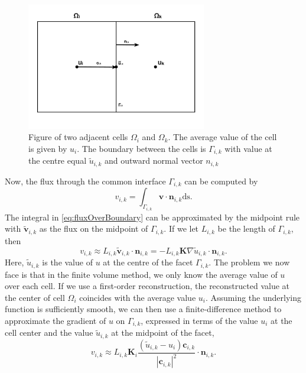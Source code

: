 \begin{figure}[H]
    \centering
    \includegraphics[width = 0.7\textwidth]{figures/grid_two_cells.pdf}
    \caption{Figure of two adjacent cells $\Omega_i$ and $\Omega_k$. The average value of the cell is given by $u_i$. The boundary between the cells is $\Gamma_{i,k}$ with value at the centre equal $\tilde{u}_{i,k}$ and outward normal vector $n_{i,k}$}
    \label{fig:gridTwoCells}
\end{figure}
Now, the flux through the common interface $\Gamma_{i,k}$ can be computed by
\begin{equation}
    v_{i,k} = \int_{\Gamma_{i,k}} \textbf{v}\cdot\textbf{n}_{i,k} \mbox{ds}. 
    \label{eq:fluxOverBoundary}
\end{equation}
The integral in \eqref{eq:fluxOverBoundary} can be approximated by the midpoint rule with $\tilde{\textbf{v}}_{i,k}$ as the flux on the midpoint of $\Gamma_{i,k}$. If we let $L_{i,k}$ be the length of $\Gamma_{i,k}$, then 
\begin{equation*}
    v_{i,k} \approx L_{i,k}\tilde{\textbf{v}}_{i,k} \cdot \textbf{n}_{i,k} = -L_{i,k}\textbf{K}\nabla \tilde{u}_{i,k} \cdot \textbf{n}_{i,k}.
\end{equation*}
Here, $\tilde{u}_{i,k}$ is the value of $u$ at the centre of the facet $\Gamma_{i,k}$. The problem we now face is that in the finite volume method, we only know the average value of $u$ over each cell. If we use a first-order reconstruction, the reconstructed value at the center of cell $\Omega_i$ coincides with the average value $u_i$. Assuming the underlying function is sufficiently smooth, we can then use a finite-difference method to approximate the gradient of $u$ on $\Gamma_{i,k}$, expressed in terms of the value $u_i$ at the cell center and the value $\tilde{u}_{i,k}$ at the midpoint of the facet,
\begin{equation*}
    v_{i,k} \approx L_{i,k}\textbf{K}_i\frac{(\tilde{u}_{i,k} - u_i)\textbf{c}_{i,k}}{|\textbf{c}_{i,k}|^2} \cdot \textbf{n}_{i,k}.
\end{equation*}
